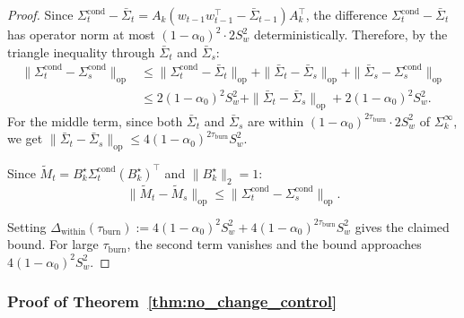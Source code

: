 \documentclass{article}
\newcommand{\op}{\mathrm{op}}
\begin{document}
\begin{proof}
Since $\Sigma_t^{\mathrm{cond}} - \bar\Sigma_t = A_k(w_{t-1}w_{t-1}^\top - \bar\Sigma_{t-1})A_k^\top$, the difference $\Sigma_t^{\mathrm{cond}} - \bar\Sigma_t$ has operator norm at most $(1-\alpha_0)^2 \cdot 2S_w^2$ deterministically.  Therefore, by the triangle inequality through $\bar\Sigma_t$ and $\bar\Sigma_s$:
\begin{align*}
\|\Sigma_t^{\mathrm{cond}} - \Sigma_s^{\mathrm{cond}}\|_{\op}
&\le \|\Sigma_t^{\mathrm{cond}} - \bar\Sigma_t\|_{\op} + \|\bar\Sigma_t - \bar\Sigma_s\|_{\op} + \|\bar\Sigma_s - \Sigma_s^{\mathrm{cond}}\|_{\op} \\
&\le 2(1-\alpha_0)^2 S_w^2 + \|\bar\Sigma_t - \bar\Sigma_s\|_{\op} + 2(1-\alpha_0)^2 S_w^2.
\end{align*}
For the middle term, since both $\bar\Sigma_t$ and $\bar\Sigma_s$ are within $(1-\alpha_0)^{2\tau_{\mathrm{burn}}} \cdot 2S_w^2$ of $\Sigma_k^\infty$, we get $\|\bar\Sigma_t - \bar\Sigma_s\|_{\op} \le 4(1-\alpha_0)^{2\tau_{\mathrm{burn}}} S_w^2$.

Since $\widetilde M_t = B_k^\star \Sigma_t^{\mathrm{cond}} (B_k^\star)^\top$ and $\|B_k^\star\|_2 = 1$:
\[
\|\widetilde M_t - \widetilde M_s\|_{\op} \le \|\Sigma_t^{\mathrm{cond}} - \Sigma_s^{\mathrm{cond}}\|_{\op}.
\]

Setting $\Delta_{\mathrm{within}}(\tau_{\mathrm{burn}}) := 4(1-\alpha_0)^2 S_w^2 + 4(1-\alpha_0)^{2\tau_{\mathrm{burn}}} S_w^2$ gives the claimed bound. For large $\tau_{\mathrm{burn}}$, the second term vanishes and the bound approaches $4(1-\alpha_0)^2 S_w^2$.
\end{proof}

\subsubsection{Proof of Theorem~\ref{thm:no_change_control}}
\label{proof:no_change_control}
\end{document}
